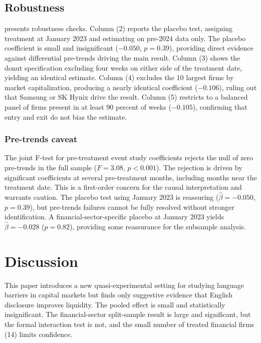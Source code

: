 \documentclass[12pt]{article}
\begin{document}
\subsection{Robustness}



 presents robustness checks. Column (2) reports the placebo test, assigning treatment at January 2023 and estimating on pre-2024 data only. The placebo coefficient is small and insignificant ($-0.050$, $p = 0.39$), providing direct evidence against differential pre-trends driving the main result. Column (3) shows the donut specification excluding four weeks on either side of the treatment date, yielding an identical estimate. Column (4) excludes the 10 largest firms by market capitalization, producing a nearly identical coefficient ($-0.106$), ruling out that Samsung or SK Hynix drive the result. Column (5) restricts to a balanced panel of firms present in at least 90 percent of weeks ($-0.105$), confirming that entry and exit do not bias the estimate.

\subsubsection*{Pre-trends caveat} The joint F-test for pre-treatment event study coefficients rejects the null of zero pre-trends in the full sample ($F = 3.08$, $p < 0.001$). The rejection is driven by significant coefficients at several pre-treatment months, including months near the treatment date. This is a first-order concern for the causal interpretation and warrants caution. The placebo test using January 2023 is reassuring ($\hat{\beta} = -0.050$, $p = 0.39$), but pre-trends failures cannot be fully resolved without stronger identification. A financial-sector-specific placebo at January 2023 yields $\hat{\beta} = -0.028$ ($p = 0.82$), providing some reassurance for the subsample analysis.


\section{Discussion}

This paper introduces a new quasi-experimental setting for studying language barriers in capital markets but finds only suggestive evidence that English disclosure improves liquidity. The pooled effect is small and statistically insignificant. The financial-sector split-sample result is large and significant, but the formal interaction test is not, and the small number of treated financial firms (14) limits confidence.
\end{document}
